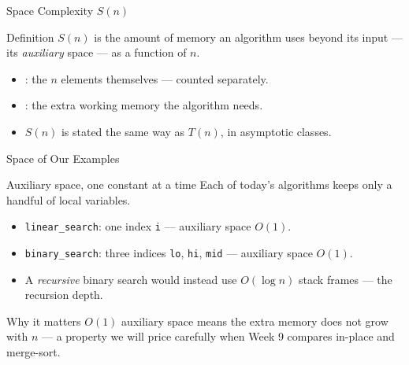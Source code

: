 \documentclass[aspectratio=169]{beamer}
\begin{document}

\begin{frame}{Space Complexity $S(n)$}
  \begin{block}{Definition}
    $S(n)$ is the amount of memory an algorithm uses beyond its input --- its
    \emph{auxiliary} space --- as a function of $n$.
  \end{block}
  \begin{itemize}
    \item {}: the $n$ elements themselves --- counted separately.
    \item {}: the extra working memory the algorithm needs.
    \item $S(n)$ is stated the same way as $T(n)$, in asymptotic classes.
  \end{itemize}
  \vspace{0.15cm}
\end{frame}

\begin{frame}{Space of Our Examples}
  \begin{block}{Auxiliary space, one constant at a time}
    Each of today's algorithms keeps only a handful of local variables.
  \end{block}
  \begin{itemize}
    \item \texttt{linear\_search}: one index \texttt{i} --- auxiliary space $O(1)$.
    \item \texttt{binary\_search}: three indices \texttt{lo}, \texttt{hi},
      \texttt{mid} --- auxiliary space $O(1)$.
    \item A \emph{recursive} binary search would instead use $O(\log n)$ stack
      frames --- the recursion depth.
  \end{itemize}
  \begin{exampleblock}{Why it matters}
    $O(1)$ auxiliary space means the extra memory does not grow with $n$ --- a
    property we will price carefully when Week 9 compares in-place and
    merge-sort. 
  \end{exampleblock}
\end{frame}

\end{document}
